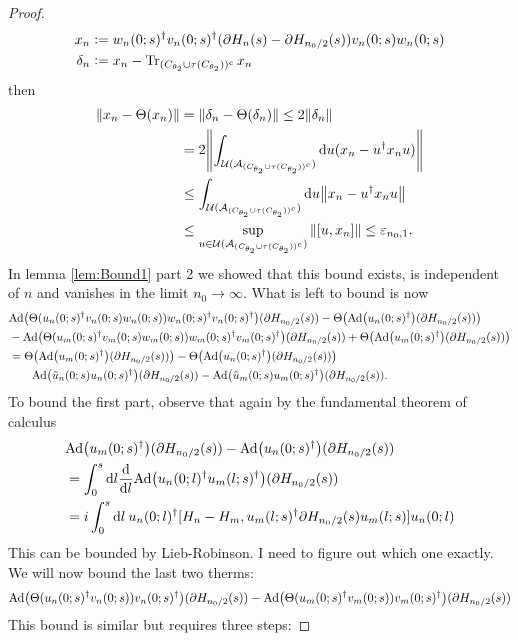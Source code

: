 \documentclass[12pt,a4paper,twoside]{article}
\renewcommand{\d}{\text{d}}
\newcommand{\defeq}{\vcentcolon=}
\let\originalleft\left
\let\originalright\right
\renewcommand{\left}{\mathopen{}\mathclose\bgroup\originalleft}
\renewcommand{\right}{\aftergroup\egroup\originalright}
\newcommand{\UU}{\mathcal U}
\renewcommand{\AA}{\mathcal A}
\newcommand{\Ad}[1]{\textrm{Ad}\left(#1\right)}
\theoremstyle{definition}
\numberwithin{equation}{section}
\begin{document}
\begin{proof}
\begin{align}
		x_n&\defeq w_n(0;s)^\dagger v_n(0;s)^\dagger(\partial H_n(s)-\partial H_{n_0/2}(s))v_n(0;s)w_n(0;s)\\
		\delta_n&\defeq x_n-\Tr_{(C_{\theta_2}\cup \tau(C_{\theta_2}))^c}x_n
	\end{align}
	then
	\begin{align}
		\norm{x_n-\Theta(x_n)}&=\norm{\delta_n-\Theta(\delta_n)}\leq 2\norm{\delta_n}\\
		&=2\norm{\int_{\UU(\AA_{(C_{\theta_2}\cup \tau(C_{\theta_2}))^c})}\d u (x_n-u^\dagger x_n u)}\\
		&\leq \int_{\UU(\AA_{(C_{\theta_2}\cup \tau(C_{\theta_2}))^c})}\d u \norm{x_n-u^\dagger x_n u}\\
		&\leq \sup_{u\in\UU(\AA_{(C_{\theta_2}\cup \tau(C_{\theta_2}))^c})}\norm{[u,x_n]}\leq \varepsilon_{n_0,1}.
	\end{align}
	In lemma \ref{lem:Bound1} part 2 we showed that this bound exists, is independent of $n$ and vanishes in the limit $n_0\rightarrow\infty.$ What is left to bound is now
	\begin{align}
		&\Ad{\Theta(u_n(0;s)^\dagger v_n(0;s)w_n(0;s))w_n(0;s)^\dagger v_n(0;s)^\dagger}(\partial H_{n_0/2}(s))-\Theta\left(\Ad{u_n(0;s)^\dagger}(\partial H_{n_0/2}(s))\right)\\
		\nonumber
		&-\Ad{\Theta(u_m(0;s)^\dagger v_m(0;s)w_m(0;s))w_m(0;s)^\dagger v_m(0;s)^\dagger}(\partial H_{n_0/2}(s))+\Theta\left(\Ad{u_m(0;s)^\dagger}(\partial H_{n_0/2}(s))\right)\\
		&=\Theta\left(\Ad{u_m(0;s)^\dagger}(\partial H_{n_0/2}(s))\right)-\Theta\left(\Ad{u_n(0;s)^\dagger}(\partial H_{n_0/2}(s))\right)\\
		\nonumber
		&\qquad \Ad{\tilde{u}_n(0;s)u_n(0;s)^\dagger}(\partial H_{n_0/2}(s))-\Ad{\tilde{u}_m(0;s)u_m(0;s)^\dagger}(\partial H_{n_0/2}(s)).
	\end{align}
	To bound the first part, observe that again by the fundamental theorem of calculus
	\begin{align}
		&\Ad{u_m(0;s)^\dagger}(\partial H_{n_0/2}(s))-\Ad{u_n(0;s)^\dagger}(\partial H_{n_0/2}(s))\\
		&=\int_0^s\d l\frac{\d}{\d l}\Ad{u_n(0;l)^{\dagger}u_m(l;s)^{\dagger}}(\partial H_{n_0/2}(s))\\
		&=i\int_0^s\d l\: u_n(0;l)^{\dagger}[H_n-H_m,u_m(l;s)^{\dagger}\partial H_{n_0/2}(s)u_m(l;s)]u_n(0;l)
	\end{align}
	This can be bounded by Lieb-Robinson. {\color{red}I need to figure out which one exactly.} We will now bound the last two therms:
	\begin{align}
		\Ad{\Theta(u_n(0;s)^\dagger v_n(0;s)) v_n(0;s)^\dagger}(\partial H_{n_0/2}(s))-\Ad{\Theta(u_m(0;s)^\dagger v_m(0;s)) v_m(0;s)^\dagger}(\partial H_{n_0/2}(s))
	\end{align}
	This bound is similar but requires three steps:

\end{proof}
\end{document}
